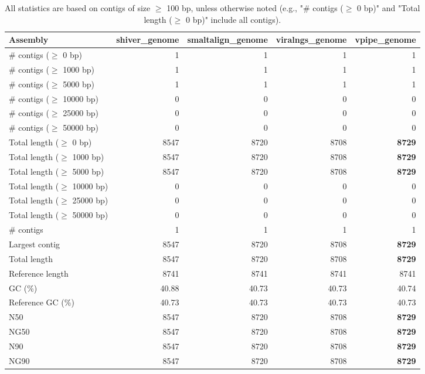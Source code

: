 \documentclass[12pt,a4paper]{article}
\begin{document}
\begin{table}[ht]
\begin{center}
\caption{All statistics are based on contigs of size $\geq$ 100 bp, unless otherwise noted (e.g., "\# contigs ($\geq$ 0 bp)" and "Total length ($\geq$ 0 bp)" include all contigs).}
\begin{tabular}{|l*{4}{|r}|}
\hline
Assembly & shiver\_genome & smaltalign\_genome & viralngs\_genome & vpipe\_genome \\ \hline
\# contigs ($\geq$ 0 bp) & 1 & 1 & 1 & 1 \\ \hline
\# contigs ($\geq$ 1000 bp) & 1 & 1 & 1 & 1 \\ \hline
\# contigs ($\geq$ 5000 bp) & 1 & 1 & 1 & 1 \\ \hline
\# contigs ($\geq$ 10000 bp) & 0 & 0 & 0 & 0 \\ \hline
\# contigs ($\geq$ 25000 bp) & 0 & 0 & 0 & 0 \\ \hline
\# contigs ($\geq$ 50000 bp) & 0 & 0 & 0 & 0 \\ \hline
Total length ($\geq$ 0 bp) & 8547 & 8720 & 8708 & {\bf 8729} \\ \hline
Total length ($\geq$ 1000 bp) & 8547 & 8720 & 8708 & {\bf 8729} \\ \hline
Total length ($\geq$ 5000 bp) & 8547 & 8720 & 8708 & {\bf 8729} \\ \hline
Total length ($\geq$ 10000 bp) & 0 & 0 & 0 & 0 \\ \hline
Total length ($\geq$ 25000 bp) & 0 & 0 & 0 & 0 \\ \hline
Total length ($\geq$ 50000 bp) & 0 & 0 & 0 & 0 \\ \hline
\# contigs & 1 & 1 & 1 & 1 \\ \hline
Largest contig & 8547 & 8720 & 8708 & {\bf 8729} \\ \hline
Total length & 8547 & 8720 & 8708 & {\bf 8729} \\ \hline
Reference length & 8741 & 8741 & 8741 & 8741 \\ \hline
GC (\%) & 40.88 & 40.73 & 40.73 & 40.74 \\ \hline
Reference GC (\%) & 40.73 & 40.73 & 40.73 & 40.73 \\ \hline
N50 & 8547 & 8720 & 8708 & {\bf 8729} \\ \hline
NG50 & 8547 & 8720 & 8708 & {\bf 8729} \\ \hline
N90 & 8547 & 8720 & 8708 & {\bf 8729} \\ \hline
NG90 & 8547 & 8720 & 8708 & {\bf 8729} \\ \hline

\end{tabular}
\end{center}
\end{table}
\end{document}
